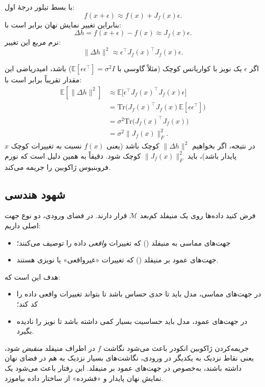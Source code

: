 \documentclass{article}
\begin{document}
با بسط تیلور درجهٔ اول:
\begin{equation}
	f(x+\epsilon)
	\approx
	f(x) + J_f(x)\epsilon.
\end{equation}
بنابراین تغییر نمایش نهان برابر است با:
\begin{equation}
	\Delta h
	=
	f(x+\epsilon) - f(x)
	\approx
	J_f(x)\epsilon.
\end{equation}
نرم مربع این تغییر:
\begin{equation}
	\|\Delta h\|^2
	\approx
	\epsilon^\top J_f(x)^\top J_f(x)\epsilon.
\end{equation}

اگر $\epsilon$ یک نویز با کواریانس کوچک (مثلاً گاوسی با $\mathbb{E}[\epsilon\epsilon^\top] = \sigma^2 I$) باشد، امیدریاضی این مقدار تقریباً برابر است با:
\begin{align}
	\mathbb{E}[\|\Delta h\|^2]
	&\approx
	\mathbb{E}\big[\epsilon^\top J_f(x)^\top J_f(x)\epsilon\big]
	\\
	&=
	\text{Tr}\big(
	J_f(x)^\top J_f(x)
	\mathbb{E}[\epsilon\epsilon^\top]
	\big)
	\\
	&=
	\sigma^2 \text{Tr}\big(
	J_f(x)^\top J_f(x)
	\big)
	\\
	&=
	\sigma^2 \|J_f(x)\|_F^2.
\end{align}
در نتیجه، اگر بخواهیم $\|\Delta h\|^2$ کوچک باشد (یعنی $f(x)$ نسبت به تغییرات کوچک $x$ پایدار باشد)، باید $\|J_f(x)\|_F^2$ کوچک شود. دقیقاً به همین دلیل است که  نورم فروبنیوس ژاکوبین را جریمه می‌کند.

\subsection{شهود هندسی }

فرض کنید داده‌ها روی یک منیفلد کم‌بعد $\mathcal{M}$ قرار دارند. در فضای ورودی، دو نوع جهت اصلی داریم:
\begin{itemize}
	\item جهت‌های مماسی به منیفلد () که تغییرات \emph{واقعی} داده را توصیف می‌کنند؛
	\item جهت‌های عمود بر منیفلد () که تغییرات «غیرواقعی» یا نویزی هستند.
\end{itemize}

هدف  این است که:
\begin{itemize}
	\item در جهت‌های مماسی، مدل باید تا حدی حساس باشد تا بتواند تغییرات واقعی داده را کد کند؛
	\item در جهت‌های عمود، مدل باید حساسیت بسیار کمی داشته باشد تا نویز را نادیده بگیرد.
\end{itemize}
جریمه‌کردن ژاکوبین انکودر باعث می‌شود نگاشت $f$ در اطراف منیفلد \emph{منقبض} شود، یعنی نقاط نزدیک به یکدیگر در ورودی، نگاشت‌های بسیار نزدیک به هم در فضای نهان داشته باشند، به‌خصوص در جهت‌های عمود بر منیفلد. این رفتار باعث می‌شود  یک نمایش نهان پایدار و «فشرده» از ساختار داده بیاموزد.
\end{document}
